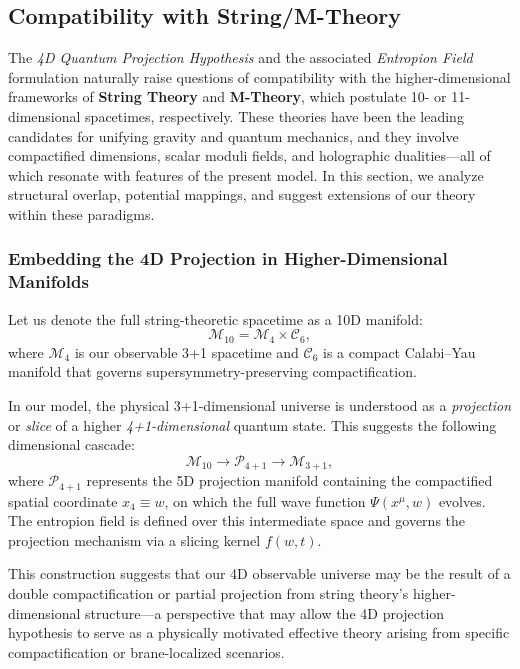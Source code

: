 \documentclass[12pt]{article}
\begin{document}
\subsection{Compatibility with String/M-Theory}

The \emph{4D Quantum Projection Hypothesis} and the associated \emph{Entropion Field} formulation naturally raise questions of compatibility with the higher-dimensional frameworks of \textbf{String Theory} and \textbf{M-Theory}, which postulate 10- or 11-dimensional spacetimes, respectively. These theories have been the leading candidates for unifying gravity and quantum mechanics, and they involve compactified dimensions, scalar moduli fields, and holographic dualities---all of which resonate with features of the present model. In this section, we analyze structural overlap, potential mappings, and suggest extensions of our theory within these paradigms.

\subsubsection*{Embedding the 4D Projection in Higher-Dimensional Manifolds}

Let us denote the full string-theoretic spacetime as a 10D manifold:
\begin{equation}
\mathcal{M}_{10} = \mathcal{M}_{4} \times \mathcal{C}_{6},
\end{equation}
where \( \mathcal{M}_{4} \) is our observable 3+1 spacetime and \( \mathcal{C}_{6} \) is a compact Calabi–Yau manifold that governs supersymmetry-preserving compactification.

In our model, the physical 3+1-dimensional universe is understood as a \emph{projection} or \emph{slice} of a higher \emph{4+1-dimensional} quantum state. This suggests the following dimensional cascade:
\begin{equation}
\mathcal{M}_{10} \longrightarrow \mathcal{P}_{4+1} \longrightarrow \mathcal{M}_{3+1},
\end{equation}
where \( \mathcal{P}_{4+1} \) represents the 5D projection manifold containing the compactified spatial coordinate \( x_4 \equiv w \), on which the full wave function \( \Psi(x^\mu, w) \) evolves. The entropion field is defined over this intermediate space and governs the projection mechanism via a slicing kernel \( f(w,t) \).

This construction suggests that our 4D observable universe may be the result of a double compactification or partial projection from string theory's higher-dimensional structure---a perspective that may allow the 4D projection hypothesis to serve as a physically motivated effective theory arising from specific compactification or brane-localized scenarios.
\end{document}
